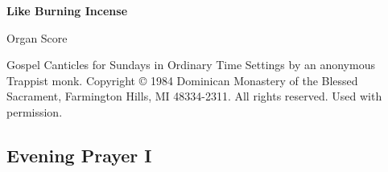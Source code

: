 \documentclass{lbi_organ_bind}
\begin{document}
\thispagestyle{empty}

\begin{center}
    \null\vfill
    \huge\bfseries
    Like Burning Incense

    \normalfont\huge
    \vspace{2\baselineskip}Organ Score

    \vspace{1\baselineskip}Gospel Canticles for Sundays in Ordinary Time
    \vfill\vfill\vfill
    \small
    Settings by an anonymous Trappist monk. Copyright © 1984 Dominican Monastery of the Blessed Sacrament, Farmington Hills, MI 48334-2311. All rights reserved. Used with permission.
\end{center}

\newpage



\newpage\null\newpage

\subsection{Evening Prayer I}

% 
% 
\end{document}
